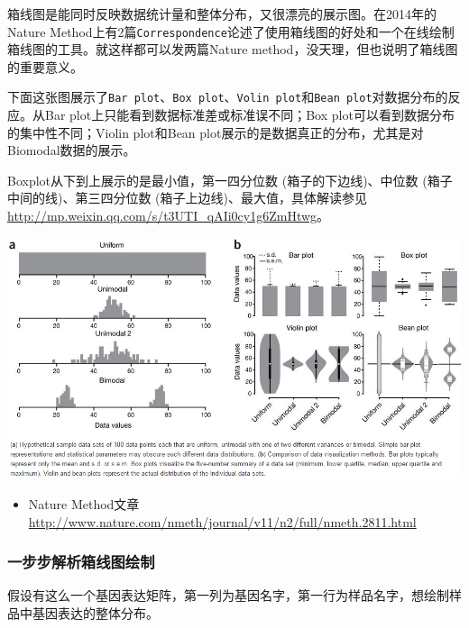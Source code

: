 \documentclass[]{article}
\providecommand{\tightlist}{%
  \setlength{\itemsep}{0pt}\setlength{\parskip}{0pt}}
\numberwithin{figure}{section}
\numberwithin{table}{section}
\theoremstyle{definition}
\theoremstyle{definition}
\theoremstyle{definition}
\theoremstyle{remark}
\begin{document}
箱线图是能同时反映数据统计量和整体分布，又很漂亮的展示图。在2014年的Nature
Method上有2篇\texttt{Correspondence}论述了使用箱线图的好处和一个在线绘制箱线图的工具。就这样都可以发两篇Nature
method，没天理，但也说明了箱线图的重要意义。

下面这张图展示了\texttt{Bar\ plot}、\texttt{Box\ plot}、\texttt{Volin\ plot}和\texttt{Bean\ plot}对数据分布的反应。从Bar
plot上只能看到数据标准差或标准误不同；Box
plot可以看到数据分布的集中性不同；Violin plot和Bean
plot展示的是数据真正的分布，尤其是对Biomodal数据的展示。

Boxplot从下到上展示的是最小值，第一四分位数 (箱子的下边线)、中位数
(箱子中间的线)、第三四分位数 (箱子上边线)、最大值，具体解读参见
\url{http://mp.weixin.qq.com/s/t3UTI_qAIi0cy1g6ZmHtwg}。

\begin{center}\includegraphics[width=0.95\linewidth,height=0.7\textheight,keepaspectratio]{images/boxplot_nm} \end{center}

\begin{itemize}
\tightlist
\item
  Nature Method文章
  \url{http://www.nature.com/nmeth/journal/v11/n2/full/nmeth.2811.html}
\end{itemize}

\subsubsection{一步步解析箱线图绘制}

假设有这么一个基因表达矩阵，第一列为基因名字，第一行为样品名字，想绘制样品中基因表达的整体分布。
\end{document}
